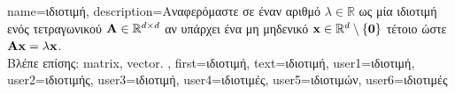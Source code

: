 {name={\foreignlanguage{greek}{ιδιοτιμή}}, 
	description={\foreignlanguage{greek}{Αναφερόμαστε σε έναν αριθμό} 
		$\lambda \in \mathbb{R}$ \foreignlanguage{greek}{ως μία ιδιοτιμή ενός τετραγωνικού}  
		$\mathbf{A} \in \mathbb{R}^{d \times d}$ 
		\foreignlanguage{greek}{αν υπάρχει ένα μη μηδενικό}  
		${\bf x} \in \mathbb{R}^{d} \setminus \{ \mathbf{0} \}$ \foreignlanguage{greek}{τέτοιο 
		ώστε} $\mathbf{A} {\bf x} = \lambda {\bf x}$. \\
		\foreignlanguage{greek}{Βλέπε επίσης:} \gls{matrix}, \gls{vector}. },
	first={\foreignlanguage{greek}{ιδιοτιμή}},
	text={\foreignlanguage{greek}{ιδιοτιμή}},
	user1={\foreignlanguage{greek}{ιδιοτιμή}}, %
	user2={\foreignlanguage{greek}{ιδιοτιμής}}, %
	user3={\foreignlanguage{greek}{ιδιοτιμή}}, %
	user4={\foreignlanguage{greek}{ιδιοτιμές}}, %
	user5={\foreignlanguage{greek}{ιδιοτιμών}}, %
	user6={\foreignlanguage{greek}{ιδιοτιμές}} %
}

